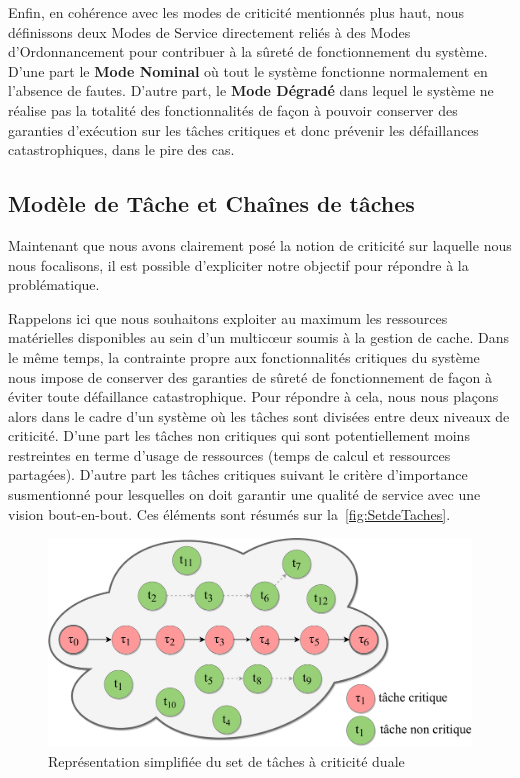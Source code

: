 \documentclass[french, a4paper, 11pt, twoside, pdftex]{StyleThese}
\begin{document}
    Enfin, en cohérence avec les modes de criticité mentionnés plus haut, nous définissons deux Modes de Service directement reliés à des Modes d'Ordonnancement pour contribuer à la sûreté de fonctionnement du système. D'une part le \textbf{Mode Nominal} où tout le système fonctionne normalement en l'absence de fautes. D'autre part, le \textbf{Mode Dégradé} dans lequel le système ne réalise pas la totalité des fonctionnalités de façon à pouvoir conserver des garanties d'exécution sur les tâches critiques et donc prévenir les défaillances catastrophiques, dans le pire des cas.
    

    \subsection{Modèle de Tâche et Chaînes de tâches}
    	Maintenant que nous avons clairement posé la notion de criticité sur laquelle nous nous focalisons, il est possible d'expliciter notre objectif pour répondre à la problématique.
    	
    	Rappelons ici que nous souhaitons exploiter au maximum les ressources matérielles disponibles au sein d'un multicœur soumis à la gestion de cache.
    	Dans le même temps, la contrainte propre aux fonctionnalités critiques du système nous impose de conserver des garanties de sûreté de fonctionnement de façon à éviter toute défaillance catastrophique.
    	Pour répondre à cela, nous nous plaçons alors dans le cadre d'un système où les tâches sont divisées entre deux niveaux de criticité. D'une part les tâches non critiques qui sont potentiellement moins restreintes en terme d'usage de ressources (temps de calcul et ressources partagées). D'autre part les tâches critiques suivant le critère d'importance susmentionné pour lesquelles on doit garantir une qualité de service avec une vision bout-en-bout. Ces éléments sont résumés sur la~\autoref{fig:SetdeTaches}.
    	
    	\begin{figure}[th]
    		\centering
    		\includegraphics[width=0.8\linewidth]{schemas/Set_de_Taches}
    		\caption{Représentation simplifiée du set de tâches à criticité duale}
    		\label{fig:SetdeTaches}
    	\end{figure}
    	
\end{document}
